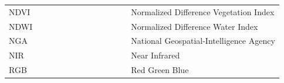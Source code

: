 \documentclass[jimaging,article,accept,pdftex,moreauthors]{Definitions/mdpi}
\begin{document}
{\begin{tabular}{@{}ll}
NDVI & ~~~~~~~~~~~~~~~~~~~~~~Normalized Difference Vegetation Index \\
NDWI & ~~~~~~~~~~~~~~~~~~~~~~Normalized Difference Water Index \\
NGA & ~~~~~~~~~~~~~~~~~~~~~~National Geospatial-Intelligence Agency \\
NIR & ~~~~~~~~~~~~~~~~~~~~~~Near Infrared \\
RGB & ~~~~~~~~~~~~~~~~~~~~~~Red Green Blue \\
\end{tabular}


}
\end{document}
